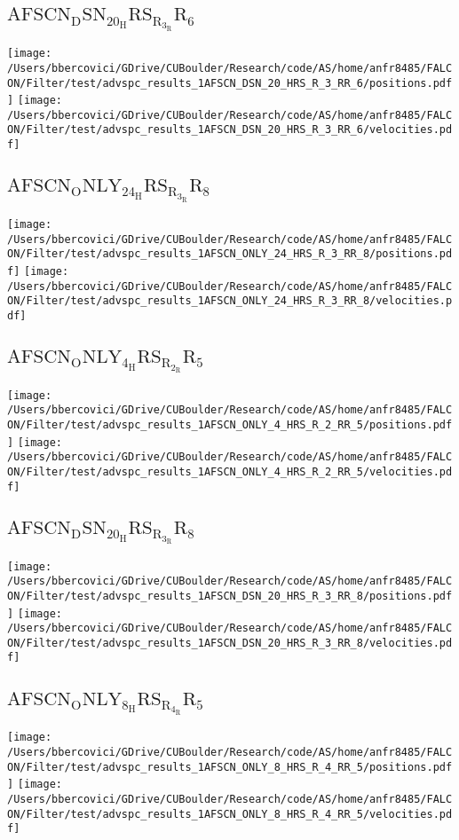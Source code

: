 \subsection{$\mathrm{AFSCN_DSN_20_HRS_R_3_RR_6}$}
\texttt{[image: /Users/bbercovici/GDrive/CUBoulder/Research/code/AS/home/anfr8485/FALCON/Filter/test/advspc\_results\_1AFSCN\_DSN\_20\_HRS\_R\_3\_RR\_6/positions.pdf]}
\texttt{[image: /Users/bbercovici/GDrive/CUBoulder/Research/code/AS/home/anfr8485/FALCON/Filter/test/advspc\_results\_1AFSCN\_DSN\_20\_HRS\_R\_3\_RR\_6/velocities.pdf]}
\subsection{$\mathrm{AFSCN_ONLY_24_HRS_R_3_RR_8}$}
\texttt{[image: /Users/bbercovici/GDrive/CUBoulder/Research/code/AS/home/anfr8485/FALCON/Filter/test/advspc\_results\_1AFSCN\_ONLY\_24\_HRS\_R\_3\_RR\_8/positions.pdf]}
\texttt{[image: /Users/bbercovici/GDrive/CUBoulder/Research/code/AS/home/anfr8485/FALCON/Filter/test/advspc\_results\_1AFSCN\_ONLY\_24\_HRS\_R\_3\_RR\_8/velocities.pdf]}
\subsection{$\mathrm{AFSCN_ONLY_4_HRS_R_2_RR_5}$}
\texttt{[image: /Users/bbercovici/GDrive/CUBoulder/Research/code/AS/home/anfr8485/FALCON/Filter/test/advspc\_results\_1AFSCN\_ONLY\_4\_HRS\_R\_2\_RR\_5/positions.pdf]}
\texttt{[image: /Users/bbercovici/GDrive/CUBoulder/Research/code/AS/home/anfr8485/FALCON/Filter/test/advspc\_results\_1AFSCN\_ONLY\_4\_HRS\_R\_2\_RR\_5/velocities.pdf]}
\subsection{$\mathrm{AFSCN_DSN_20_HRS_R_3_RR_8}$}
\texttt{[image: /Users/bbercovici/GDrive/CUBoulder/Research/code/AS/home/anfr8485/FALCON/Filter/test/advspc\_results\_1AFSCN\_DSN\_20\_HRS\_R\_3\_RR\_8/positions.pdf]}
\texttt{[image: /Users/bbercovici/GDrive/CUBoulder/Research/code/AS/home/anfr8485/FALCON/Filter/test/advspc\_results\_1AFSCN\_DSN\_20\_HRS\_R\_3\_RR\_8/velocities.pdf]}
\subsection{$\mathrm{AFSCN_ONLY_8_HRS_R_4_RR_5}$}
\texttt{[image: /Users/bbercovici/GDrive/CUBoulder/Research/code/AS/home/anfr8485/FALCON/Filter/test/advspc\_results\_1AFSCN\_ONLY\_8\_HRS\_R\_4\_RR\_5/positions.pdf]}
\texttt{[image: /Users/bbercovici/GDrive/CUBoulder/Research/code/AS/home/anfr8485/FALCON/Filter/test/advspc\_results\_1AFSCN\_ONLY\_8\_HRS\_R\_4\_RR\_5/velocities.pdf]}
